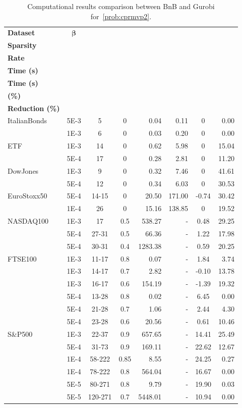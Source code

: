 \documentclass[11pt]{article}
\theoremstyle{plain}
\theoremstyle{definition}
\theoremstyle{plain}
\begin{document}
\begin{table}[!htbp]
\centering
\fontsize{10}{12}\selectfont
\setlength{\tabcolsep}{3.5pt}
\renewcommand{\arraystretch}{0.95}
\caption{Computational results comparison between BnB and Gurobi for~\eqref{prob:cprmvp2}.}
\label{tab:results2}
\begin{tabular}{lcccrrcr}
\hline
\textbf{Dataset} & $\boldsymbol{\beta}$ &
\makecell{\textbf{Solution} \\ \textbf{Sparsity}} &
\makecell{\textbf{Drop} \\ \textbf{Rate}} &
\makecell{\textbf{BnB CPU} \\ \textbf{Time (s)}} &
\makecell{\textbf{Gurobi CPU} \\ \textbf{Time (s)}} &
\makecell{\textbf{Error} \\ \textbf{(\%)}} &
\makecell{\textbf{Node} \\ \textbf{Reduction (\%)}} \\
\hline
ItalianBonds & 5E-3 & 5 & 0 & 0.04 & 0.11 & 0 & 0.00 \\
        & 1E-3 & 6 & 0 & 0.03 & 0.20 & 0 & 0.00 \\
ETF & 1E-3 & 14 & 0 & 0.62 & 5.98 & 0 & 15.04 \\
        & 5E-4 & 17 & 0 & 0.28 & 2.81 & 0 & 11.20 \\
DowJones & 1E-3 & 9 & 0 & 0.32 & 7.46 & 0 & 41.61 \\
        & 5E-4 & 12 & 0 & 0.34 & 6.03 & 0 & 30.53 \\
EuroStoxx50 & 5E-4 & 14-15 & 0 & 20.50 & 171.00 & -0.74 & 30.42 \\
        & 1E-4 & 26 & 0 & 15.16 & 138.85 & 0 & 19.52 \\
NASDAQ100 & 1E-3 & 17 & 0.5 & 538.27 & - & 0.48 & 29.25 \\
        & 5E-4 & 27-31 & 0.5 & 66.36 & - & 1.22 & 17.98 \\
        & 5E-4 & 30-31 & 0.4 & 1283.38 & - & 0.59 & 20.25 \\
FTSE100 & 1E-3 & 11-17 & 0.8 & 0.07 & - & 1.84 & 3.74 \\
        & 1E-3 & 14-17 & 0.7 & 2.82 & - & -0.10 & 13.78 \\
        & 1E-3 & 16-17 & 0.6 & 154.19 & - & -1.39 & 19.32 \\
        & 5E-4 & 13-28 & 0.8 & 0.02 & - & 6.45 & 0.00 \\
        & 5E-4 & 21-28 & 0.7 & 1.06 & - & 2.44 & 4.30 \\
        & 5E-4 & 23-28 & 0.6 & 20.56 & - & 0.61 & 10.46 \\
S\&P500 & 1E-3 & 22-37 & 0.9 & 657.65 & - & 14.41 & 25.49 \\
        & 5E-4 & 31-73 & 0.9 & 169.11 & - & 22.62 & 12.67 \\
        & 1E-4 & 58-222 & 0.85 & 8.55 & - & 24.25 & 0.27 \\
        & 1E-4 & 78-222 & 0.8 & 564.04 & - & 16.67 & 0.00 \\
        & 5E-5 & 80-271 & 0.8 & 9.79 & - & 19.90 & 0.03 \\
        & 5E-5 & 120-271 & 0.7 & 5448.01 & - & 10.94 & 0.00 \\
\hline
\end{tabular}
\end{table}
\end{document}
